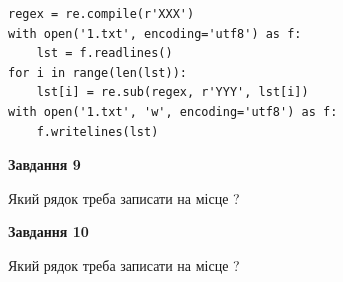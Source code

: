 \documentclass[12pt, ukrainian]{article}
\begin{document}
{\begin {large}
\begin{verbatim}
regex = re.compile(r'XXX')
with open('1.txt', encoding='utf8') as f:
    lst = f.readlines()
for i in range(len(lst)):
    lst[i] = re.sub(regex, r'YYY', lst[i])
with open('1.txt', 'w', encoding='utf8') as f:
    f.writelines(lst)
\end{verbatim}






{\begin {center}\textbf{Завдання 9}\end {center}}\par
Який рядок треба записати на місце  ?\par
\vspace{5mm}


{\begin {center}\textbf{Завдання 10}\end {center}}\par
Який рядок треба записати на місце  ?\par


\newpage


\end {large}}
\end{document}
